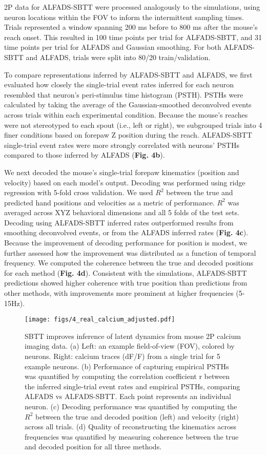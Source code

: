 \documentclass{article}
\begin{document}
2P data for ALFADS-SBTT were processed analogously to the simulations, using neuron locations within the FOV to inform the intermittent sampling times. Trials represented a window spanning 200 ms before to 800 ms after the mouse's reach onset. This resulted in 100 time points per trial for ALFADS-SBTT, and 31 time points per trial for ALFADS and Gaussian smoothing. For both ALFADS-SBTT and ALFADS, trials were split into 80/20 train/validation. 

To compare representations inferred by ALFADS-SBTT and ALFADS, we first evaluated how closely the single-trial event rates inferred for each neuron resembled that neuron's peri-stimulus time histogram (PSTH). PSTHs were calculated by taking the average of the Gaussian-smoothed deconvolved events across trials within each experimental condition. Because the mouse's reaches were not stereotyped to each spout (i.e., left or right), we subgrouped trials into 4 finer conditions based on forepaw Z position during the reach. ALFADS-SBTT single-trial event rates were more strongly correlated with neurons' PSTHs compared to those inferred by ALFADS (\textbf{Fig. 4b}). 

We next decoded the mouse’s single-trial forepaw kinematics (position and velocity) based on each model’s output. Decoding was performed using ridge regression with 5-fold cross validation. We used $R^2$ between the true and predicted hand positions and velocities as a metric of performance. $R^2$ was averaged across XYZ behavioral dimensions and all 5 folds of the test sets. Decoding using ALFADS-SBTT inferred rates outperformed results from smoothing deconvolved events, or from the ALFADS inferred rates (\textbf{Fig. 4c}). Because the improvement of decoding performance for position is modest, we further assessed how the improvement was distributed as a function of temporal frequency. We computed the coherence between the true and decoded positions for each method (\textbf{Fig. 4d}). Consistent with the simulations, ALFADS-SBTT predictions showed higher coherence with true position than predictions from other methods, with improvements more prominent at higher frequencies (5-15Hz).

\begin{figure}
  \centering
   \texttt{[image: figs/4\_real\_calcium\_adjusted.pdf]}
  \caption{SBTT improves inference of latent dynamics from mouse 2P calcium imaging data. (a) Left: an example field-of-view (FOV), colored by neurons. Right: calcium traces (dF/F) from a single trial for 5 example neurons. (b) Performance of capturing empirical PSTHs was quantified by computing the correlation coefficient r between the inferred single-trial event rates and empirical PSTHs, comparing ALFADS vs ALFADS-SBTT. Each point represents an individual neuron. (c) Decoding performance was quantified by computing the $R^2$ between the true and decoded position (left) and velocity (right) across all trials. (d) Quality of reconstructing the kinematics across frequencies was quantified by measuring coherence between the true and decoded position for all three methods.}
  \label{fig:real_calcium}
\end{figure}
\end{document}
